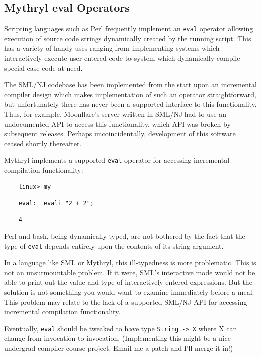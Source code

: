 \cutend*


\subsection{Mythryl eval Operators}

Scripting languages such as Perl frequently implement an {\tt eval} operator 
allowing execution of source code strings dynamically created by the running 
script.  This has a variety of handy uses ranging from implementing systems 
which interactively execute user-entered code to system which dynamically 
compile special-case code at need.

The {\sc SML/NJ} codebase has been implemented from the start upon an 
incremental compiler design which makes implementation of such an operator 
straightforward, but unfortunately there has never been a supported 
interface to this functionality.  Thus, for example, Moonflare's 
server written in SML/NJ had to use an undocumented API to access this 
functionality, which API was broken by subsequent releases.  Perhaps 
uncoincidentally, development of this software ceased shortly thereafter.

Mythryl implements a supported {\tt eval} operator for accessing incremental 
compilation functionality:

\begin{verbatim}
    linux> my

    eval:  evali "2 + 2";

    4
\end{verbatim}

Perl and bash, being dynamically typed, are not bothered by the fact 
that the type of {\tt eval} depends entirely upon the contents of its 
string argument.

In a language like {\sc SML} or Mythryl, this ill-typedness is more 
problematic.  This is not an unsurmountable problem.  If it were, 
{\sc SML}'s interactive mode would not be able to print out the 
value and type of interactively entered expressions.  But the solution 
is not something you would want to examine immediately before a meal. 
This problem may relate to the lack of a supported {\sc SML/NJ} {\sc API} 
for accessing incremental compilation functionality.

Eventually, {\tt eval} should be tweaked to have type {\tt String -> X} 
where X can change from invocation to invocation.  (Implementing this 
might be a nice undergrad compiler course project.  Email me a patch 
and I'll merge it in!)

